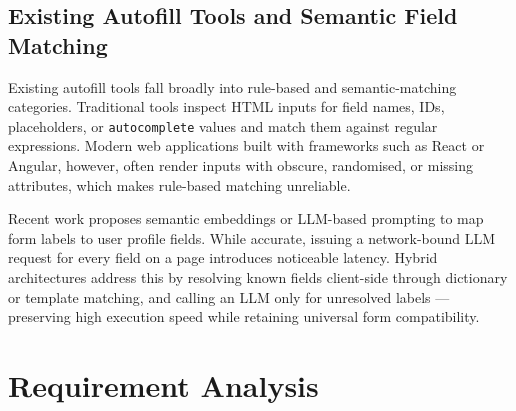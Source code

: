 \documentclass[12pt,a4paper]{report}
\begin{document}
\section{Existing Autofill Tools and Semantic Field Matching}
Existing autofill tools fall broadly into rule-based and semantic-matching categories. Traditional tools inspect HTML inputs for field names, IDs, placeholders, or \texttt{autocomplete} values and match them against regular expressions. Modern web applications built with frameworks such as React or Angular, however, often render inputs with obscure, randomised, or missing attributes, which makes rule-based matching unreliable.

Recent work proposes semantic embeddings or LLM-based prompting to map form labels to user profile fields. While accurate, issuing a network-bound LLM request for every field on a page introduces noticeable latency. Hybrid architectures address this by resolving known fields client-side through dictionary or template matching, and calling an LLM only for unresolved labels — preserving high execution speed while retaining universal form compatibility.

\chapter{Requirement Analysis}
\end{document}
